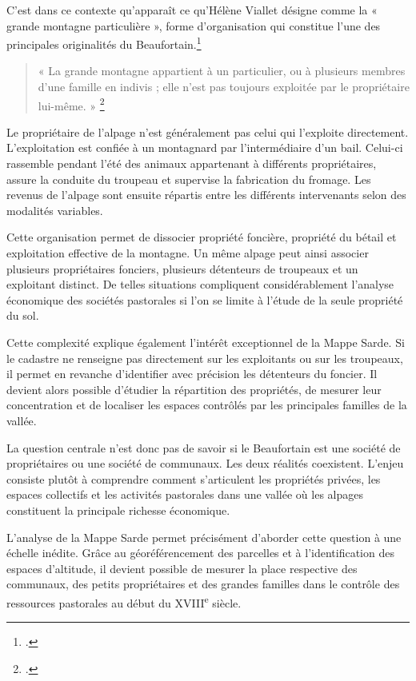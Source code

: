 \documentclass[12pt,a4paper]{report}
\begin{document}
C'est dans ce contexte qu'apparaît ce qu'Hélène Viallet désigne comme la « grande montagne particulière », forme d'organisation qui constitue l'une des principales originalités du Beaufortain.\footcite[48]{HViallet1993}

\begin{quote}
	« La grande montagne appartient à un particulier, ou à plusieurs membres d'une famille en indivis ; elle n'est pas toujours exploitée par le propriétaire lui-même. »
	\footcite[48]{HViallet1993}
\end{quote}

Le propriétaire de l'alpage n'est généralement pas celui qui l'exploite directement. L'exploitation est confiée à un montagnard par l'intermédiaire d'un bail. Celui-ci rassemble pendant l'été des animaux appartenant à différents propriétaires, assure la conduite du troupeau et supervise la fabrication du fromage. Les revenus de l'alpage sont ensuite répartis entre les différents intervenants selon des modalités variables.

Cette organisation permet de dissocier propriété foncière, propriété du bétail et exploitation effective de la montagne. Un même alpage peut ainsi associer plusieurs propriétaires fonciers, plusieurs détenteurs de troupeaux et un exploitant distinct. De telles situations compliquent considérablement l'analyse économique des sociétés pastorales si l'on se limite à l'étude de la seule propriété du sol.

Cette complexité explique également l'intérêt exceptionnel de la Mappe Sarde. Si le cadastre ne renseigne pas directement sur les exploitants ou sur les troupeaux, il permet en revanche d'identifier avec précision les détenteurs du foncier. Il devient alors possible d'étudier la répartition des propriétés, de mesurer leur concentration et de localiser les espaces contrôlés par les principales familles de la vallée.

La question centrale n'est donc pas de savoir si le Beaufortain est une société de propriétaires ou une société de communaux. Les deux réalités coexistent. L'enjeu consiste plutôt à comprendre comment s'articulent les propriétés privées, les espaces collectifs et les activités pastorales dans une vallée où les alpages constituent la principale richesse économique.

L'analyse de la Mappe Sarde permet précisément d'aborder cette question à une échelle inédite. Grâce au géoréférencement des parcelles et à l'identification des espaces d'altitude, il devient possible de mesurer la place respective des communaux, des petits propriétaires et des grandes familles dans le contrôle des ressources pastorales au début du XVIII\textsuperscript{e} siècle.
\end{document}
